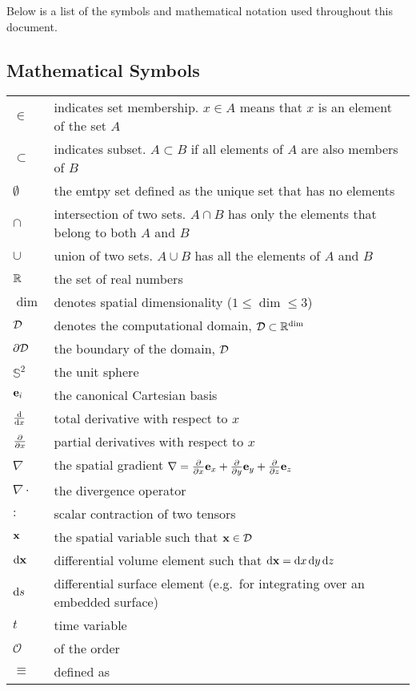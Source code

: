 \documentclass[../doc.tex]{subfiles}
\begin{document}
\renewcommand{\arraystretch}{1.1}
Below is a list of the symbols and mathematical notation used throughout this document. 

\subsection*{Mathematical Symbols}
\begin{longtable}{p{2cm}p{12cm}}
$\in$ & indicates set membership. $x \in A$ means that $x$ is an element of the set $A$\\
$\subset$ & indicates subset. $A \subset B$ if all elements of $A$ are also members of $B$ \\
$\emptyset$ & the emtpy set defined as the unique set that has no elements \\
$\cap$ & intersection of two sets. $A\cap B$ has only the elements that belong to both $A$ and $B$ \\
$\cup$ & union of two sets. $A\cup B$ has all the elements of $A$ and $B$ \\
$\mathbb{R}$ & the set of real numbers \\
$\dim$ & denotes spatial dimensionality ($1\leq \dim \leq 3$) \\
$\mathcal{D}$ & denotes the computational domain, $\mathcal{D} \subset \mathbb{R}^{\dim}$\\ 
$\partial\mathcal{D}$ & the boundary of the domain, $\mathcal{D}$ \\
$\mathbb{S}^2$ & the unit sphere \\
$\boldsymbol{\mathrm{e}}_i$ & the canonical Cartesian basis \\
$\frac{\mathop{}\!\mathrm{d} }{\mathop{}\!\mathrm{d} x}$ & total derivative with respect to $x$ \\
$\frac{\partial }{\partial x}$ & partial derivatives with respect to $x$ \\
$\nabla$ & the spatial gradient $\nabla = \frac{\partial }{\partial x} \boldsymbol{\mathrm{e}}_x + \frac{\partial }{\partial y}\boldsymbol{\mathrm{e}}_y + \frac{\partial }{\partial z}\boldsymbol{\mathrm{e}}_z$ \\
$\nabla\cdot$ & the divergence operator \\
$:$ & scalar contraction of two tensors \\
$\boldsymbol{\mathrm{x}}$ & the spatial variable such that $\boldsymbol{\mathrm{x}} \in \mathcal{D}$ \\
$\mathop{}\!\mathrm{d}\boldsymbol{\mathrm{x}}$ & differential volume element such that $\mathop{}\!\mathrm{d}\boldsymbol{\mathrm{x}} = \mathop{}\!\mathrm{d} x \mathop{}\!\mathrm{d} y \mathop{}\!\mathrm{d} z$ \\ 
$\mathop{}\!\mathrm{d} s$ & differential surface element (e.g.~for integrating over an embedded surface) \\
$t$ & time variable \\
$\mathcal{O}$ & of the order \\
$\equiv$ & defined as \\
\end{longtable}
\end{document}

